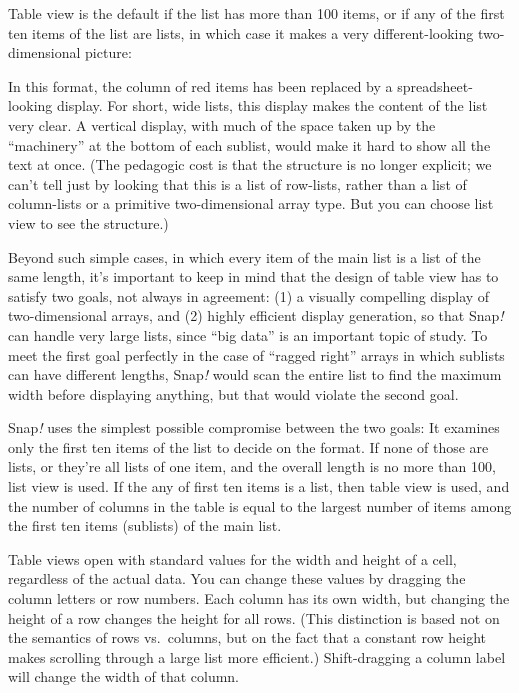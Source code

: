 \documentclass[
  letterpaper,
]{book}
\begin{document}
Table view is the default if the list has more than 100 items, or if any
of the first ten items of the list are lists, in which case it makes a
very different-looking two-dimensional picture:

In this format, the column of red items has been replaced by a
spreadsheet-looking display. For short, wide lists, this display makes
the content of the list very clear. A vertical display, with much of the
space taken up by the ``machinery'' at the bottom of each sublist, would
make it hard to show all the text at once. (The pedagogic cost is that
the structure is no longer explicit; we can't tell just by looking that
this is a list of row-lists, rather than a list of column-lists or a
primitive two-dimensional array type. But you can choose list view to
see the structure.)

Beyond such simple cases, in which every item of the main list is a list
of the same length, it's important to keep in mind that the design of
table view has to satisfy two goals, not always in agreement: (1) a
visually compelling display of two-dimensional arrays, and (2) highly
efficient display generation, so that Snap\emph{!} can handle very large
lists, since ``big data'' is an important topic of study. To meet the
first goal perfectly in the case of ``ragged right'' arrays in which
sublists can have different lengths, Snap\emph{!} would scan the entire
list to find the maximum width before displaying anything, but that
would violate the second goal.

Snap\emph{!} uses the simplest possible compromise between the two
goals: It examines only the first ten items of the list to decide on the
format. If none of those are lists, or they're all lists of one item,
and the overall length is no more than 100, list view is used. If the
any of first ten items is a list, then table view is used, and the
number of columns in the table is equal to the largest number of items
among the first ten items (sublists) of the main list.

Table views open with standard values for the width and height of a
cell, regardless of the actual data. You can change these values by
dragging the column letters or row numbers. Each column has its own
width, but changing the height of a row changes the height for all rows.
(This distinction is based not on the semantics of rows vs.~columns, but
on the fact that a constant row height makes scrolling through a large
list more efficient.) Shift-dragging a column label will change the
width of that column.
\end{document}
